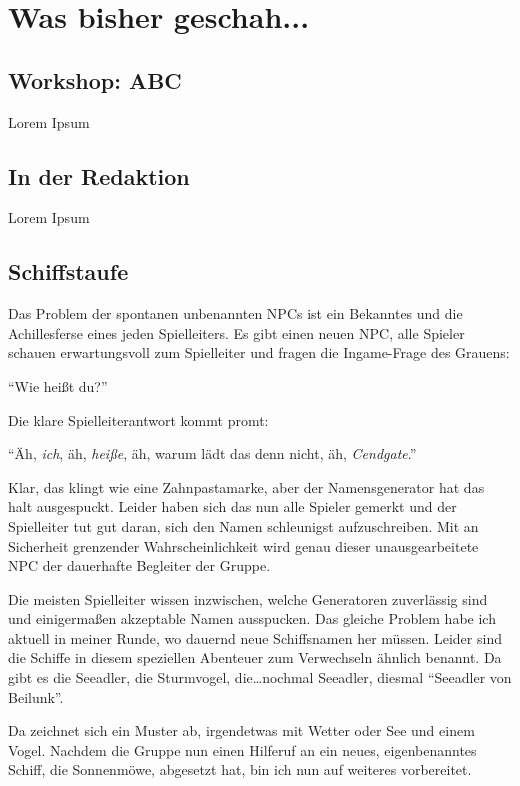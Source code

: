 \documentclass[final]{multiversum}
\begin{document}
\makemultititle
%

\section{Was bisher geschah...}

\subsection{Workshop: ABC}
Lorem Ipsum

\subsection{In der Redaktion}
Lorem Ipsum

\subsection{Schiffstaufe}
Das Problem der spontanen unbenannten NPCs ist ein Bekanntes und die Achillesferse eines jeden Spielleiters.
Es gibt einen neuen NPC, alle Spieler schauen erwartungsvoll zum Spielleiter und fragen die Ingame-Frage des Grauens:

\enquote{Wie heißt du?}

Die klare Spielleiterantwort kommt promt:

\enquote{Äh, \textit{ich}, äh, \textit{heiße}, äh, warum lädt das denn nicht, äh, \textit{Cendgate}.}

Klar, das klingt wie eine Zahnpastamarke, aber der Namensgenerator hat das halt ausgespuckt.
Leider haben sich das nun alle Spieler gemerkt und der Spielleiter tut gut daran, sich den Namen schleunigst aufzuschreiben.
Mit an Sicherheit grenzender Wahrscheinlichkeit wird genau dieser unausgearbeitete NPC der dauerhafte Begleiter der Gruppe.

Die meisten Spielleiter wissen inzwischen, welche Generatoren zuverlässig sind und einigermaßen akzeptable Namen ausspucken.
Das gleiche Problem habe ich aktuell in meiner Runde, wo dauernd neue Schiffsnamen her müssen.
Leider sind die Schiffe in diesem speziellen Abenteuer zum Verwechseln ähnlich benannt.
Da gibt es die Seeadler, die Sturmvogel, die\dots nochmal Seeadler, diesmal \enquote{Seeadler von Beilunk}.

Da zeichnet sich ein Muster ab, irgendetwas mit Wetter oder See und einem Vogel.
Nachdem die Gruppe nun einen Hilferuf an ein neues, eigenbenanntes Schiff, die Sonnenmöwe, abgesetzt hat, bin ich nun auf weiteres vorbereitet.
\end{document}
